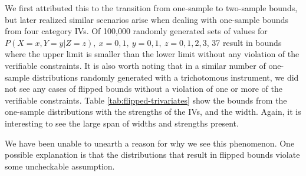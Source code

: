 \documentclass[AMA,STIX1COL,]{WileyNJD-v2}
\begin{document}
We first attributed this to the transition from one-sample to two-sample
bounds, but later realized similar scenarios arise when dealing with
one-sample bounds from four category IVs. Of 100,000 randomly generated
sets of values for
\(P(X = x, Y = y | Z = z),\ x=0,1,\ y=0,1,\ z=0,1,2,3\), 37 result in
bounds where the upper limit is smaller than the lower limit without any
violation of the verifiable constraints. It is also worth noting that in
a similar number of one-sample distributions randomly generated with a
trichotomous instrument, we did not see any cases of flipped bounds
without a violation of one or more of the verifiable constraints. Table
\ref{tab:flipped-trivariates} show the bounds from the one-sample
distributions with the strengths of the IVs, and the width. Again, it is
interesting to see the large span of widths and strengths present.

We have been unable to unearth a reason for why we see this phenomenon.
One possible explanation is that the distributions that result in
flipped bounds violate some uncheckable assumption.

\begingroup\fontsize{9}{11}\selectfont
\end{document}
